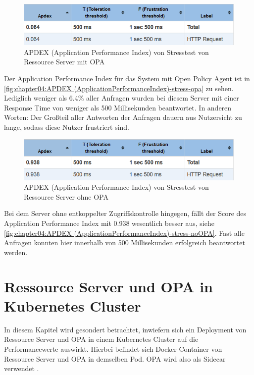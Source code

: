 \begin{figure}[H]
  \centering
  \includegraphics[width=1.0\textwidth]{gfx/APDEX (Application Performance Index)-stress-opa.png}
  \caption{APDEX (Application Performance Index) von Stresstest von Ressource Server mit OPA}
  \label{fig:chapter04:APDEX (ApplicationPerformanceIndex)-stress-opa}
\end{figure}

Der Application Performance Index für das System mit Open Policy Agent ist in \autoref{fig:chapter04:APDEX (ApplicationPerformanceIndex)-stress-opa} zu sehen. Lediglich weniger als 6.4\% aller Anfragen wurden bei diesem Server mit einer Response Time von weniger als 500 Millisekunden beantwortet. In anderen Worten: Der Großteil aller Antworten der Anfragen dauern aus Nutzersicht zu lange, sodass diese Nutzer frustriert sind.

\begin{figure}[H]
  \centering
  \includegraphics[width=1.0\textwidth]{gfx/APDEX (Application Performance Index)-stress-noOPA.png}
  \caption{APDEX (Application Performance Index) von Stresstest von Ressource Server ohne OPA}
  \label{fig:chapter04:APDEX (ApplicationPerformanceIndex)-stress-noOPA}
\end{figure}

Bei dem Server ohne entkoppelter Zugriffskontrolle hingegen, fällt der Score des Application Performance Index mit 0.938 wesentlich besser aus, siehe \autoref{fig:chapter04:APDEX (ApplicationPerformanceIndex)-stress-noOPA}. Fast alle Anfragen konnten hier innerhalb von 500 Millisekunden erfolgreich beantwortet werden. 

\section{Ressource Server und OPA in Kubernetes Cluster}

In diesem Kapitel wird gesondert betrachtet, inwiefern sich ein Deployment von Ressource Server und OPA in einem Kubernetes Cluster auf die Performancewerte auswirkt. Hierbei befindet sich Docker-Container von Ressource Server und OPA in demselben Pod. OPA wird also als Sidecar verwendet \citep{sidecar:2017}. 

